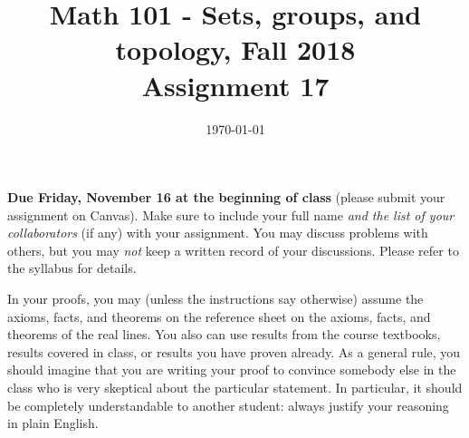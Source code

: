 \documentclass{amsart}
\title[Math 101, Fall 2018: assignment 17]{Math 101 - Sets, groups, and topology, Fall 2018 \\ Assignment 17}
\date{\today}
\theoremstyle{definition}
\begin{document}

\maketitle

\textbf{Due Friday, November 16 at the beginning of class} (please submit your assignment on Canvas). Make sure to include your full name \emph{and the list of your collaborators} (if any) with your assignment. You may discuss problems with others, but you may \emph{not} keep a written record of your discussions. Please refer to the syllabus for details.

In your proofs, you may (unless the instructions say otherwise) assume the axioms, facts, and theorems on the reference sheet on the axioms, facts, and theorems of the real lines. You also can use results from the course textbooks, results covered in class, or results you have proven already. As a general rule, you should imagine that you are writing your proof to convince somebody else in the class who is very skeptical about the particular statement. In particular, it should be completely understandable to another student: always justify your reasoning in plain English. 
\end{document}
